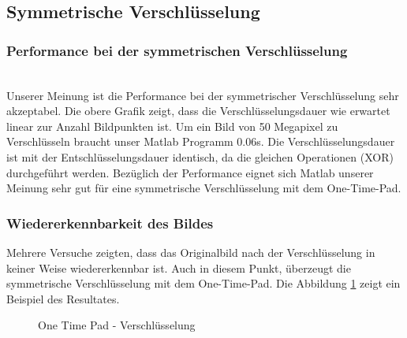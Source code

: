 \documentclass[paper=a4,fontsize=12pt]{scrartcl}
\begin{document}
\subsection{Symmetrische Verschlüsselung}
\subsubsection{Performance bei der symmetrischen Verschlüsselung}
 \\
Unserer Meinung ist die Performance bei der symmetrischer Verschlüsselung sehr akzeptabel.
Die obere Grafik zeigt, dass die Verschlüsselungsdauer wie erwartet linear zur Anzahl Bildpunkten ist.
Um ein Bild von 50 Megapixel zu Verschlüsseln braucht unser Matlab Programm 0.06s.
Die Verschlüsselungsdauer ist mit der Entschlüsselungsdauer identisch, da die gleichen Operationen (XOR) durchgeführt werden.
Bezüglich der Performance eignet sich Matlab unserer Meinung sehr gut für eine symmetrische Verschlüsselung mit dem One-Time-Pad.

\subsubsection{Wiedererkennbarkeit des Bildes}
Mehrere Versuche zeigten, dass das Originalbild nach der Verschlüsselung in keiner Weise wiedererkennbar ist.
Auch in diesem Punkt, überzeugt die symmetrische Verschlüsselung mit dem One-Time-Pad.
Die Abbildung \ref{sym-enc-result} zeigt ein Beispiel des Resultates.
\begin{figure}[H] 
	\centering
	\caption[One Time Pad - Verschlüsselung]{One Time Pad - Verschlüsselung}  
	\label{sym-enc-result} 
\end{figure}
\end{document}
